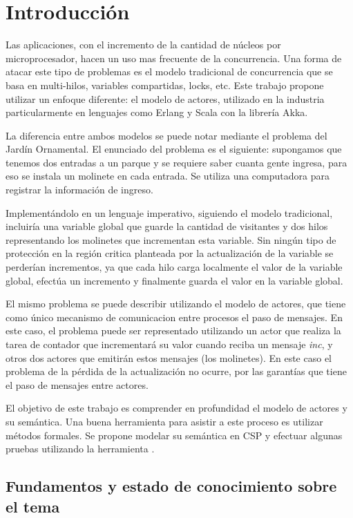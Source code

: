 \chapter{Introducción}

Las aplicaciones, con el incremento de la cantidad de núcleos por microprocesador, hacen un uso mas frecuente de la concurrencia. Una forma de atacar este tipo de problemas es el modelo tradicional de concurrencia que se basa en multi-hilos, variables compartidas, locks, etc. Este trabajo propone utilizar un enfoque diferente: el modelo de actores, utilizado en la industria particularmente en lenguajes como Erlang\cite{Cesarini:2009:EP:1717841} y Scala\cite{scala-overview-tech-report} con la librería Akka\cite{Wyatt:2013:AC:2663429}. 

La diferencia entre ambos modelos se puede notar mediante el problema del Jardín Ornamental. El enunciado del problema es el siguiente: supongamos que tenemos dos entradas a un parque y se requiere saber cuanta gente ingresa, para eso se instala un molinete en cada entrada. Se utiliza una computadora para registrar la información de ingreso.

Implementándolo en un lenguaje imperativo, siguiendo el modelo tradicional, incluiría una variable global que guarde la cantidad de visitantes y dos hilos representando los molinetes que incrementan esta variable. Sin ningún tipo de protección en la región critica planteada por la actualización de la variable se perderían incrementos, ya que cada hilo carga localmente el valor de la variable global, efectúa un incremento y finalmente guarda el valor en la variable global. 

El mismo problema se puede describir utilizando el modelo de actores, que tiene como único mecanismo de comunicacion entre procesos el paso de mensajes. En este caso, el problema puede ser representado utilizando un actor que realiza la tarea de contador que incrementará su valor cuando reciba un mensaje \emph{inc}, y otros dos actores que emitirán estos mensajes (los molinetes). En este caso el problema de la pérdida de la actualización no ocurre, por las garantías que tiene el paso de mensajes entre actores. 

El objetivo de este trabajo es comprender en profundidad el modelo de actores y su semántica. Una buena herramienta para asistir a este proceso es utilizar métodos formales. Se propone modelar su semántica en CSP y efectuar algunas pruebas utilizando la herramienta \FDR\cite{fdr}.

\section{Fundamentos y estado de conocimiento sobre el tema}
 
